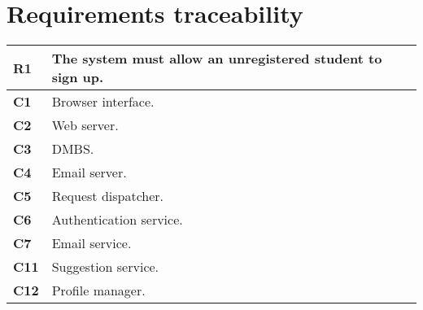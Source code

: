 \chapter{Requirements traceability}


\begin{table}[H]
    \centering
    \begin{tabular}{|l|m{10cm}|}
        \hline \textbf{R1} & The system must allow an unregistered student to sign up. \\
        \hline \textbf{C1} & Browser interface. \\
        \hline \textbf{C2} & Web server. \\
        \hline \textbf{C3} & DMBS. \\
        \hline \textbf{C4} & Email server. \\
        \hline \textbf{C5} & Request dispatcher. \\
        \hline \textbf{C6} & Authentication service. \\
        \hline \textbf{C7} & Email service. \\
        \hline \textbf{C11} & Suggestion service. \\
        \hline \textbf{C12} & Profile manager.\\
        \hline
    \end{tabular}
\end{table}

